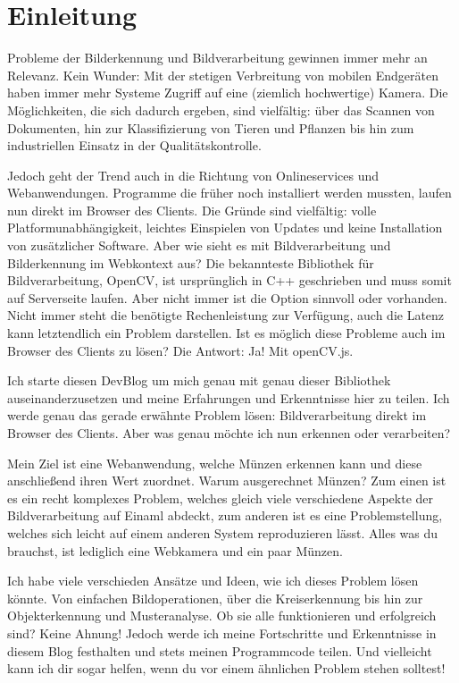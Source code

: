 \section{Einleitung}

Probleme der Bilderkennung und Bildverarbeitung gewinnen immer mehr an Relevanz. Kein Wunder: Mit der stetigen Verbreitung von mobilen Endgeräten haben immer mehr Systeme Zugriff auf eine (ziemlich hochwertige) Kamera. Die Möglichkeiten, die sich dadurch ergeben, sind vielfältig: über das Scannen von Dokumenten, hin zur Klassifizierung von Tieren und Pflanzen bis hin zum industriellen Einsatz in der Qualitätskontrolle.

Jedoch geht der Trend auch in die Richtung von Onlineservices und Webanwendungen. Programme die früher noch installiert werden mussten, laufen nun direkt im Browser des Clients. Die Gründe sind vielfältig: volle Platformunabhängigkeit, leichtes Einspielen von Updates und keine Installation von zusätzlicher Software. Aber wie sieht es mit Bildverarbeitung und Bilderkennung im Webkontext aus? Die bekannteste Bibliothek für Bildverarbeitung, OpenCV, ist ursprünglich in C++ geschrieben und muss somit auf Serverseite laufen. Aber nicht immer ist die Option sinnvoll oder vorhanden. Nicht immer steht die benötigte Rechenleistung zur Verfügung, auch die Latenz kann letztendlich ein Problem darstellen. Ist es möglich diese Probleme auch im Browser des Clients zu lösen? Die Antwort: Ja! Mit openCV.js.

Ich starte diesen DevBlog um mich genau mit genau dieser Bibliothek auseinanderzusetzen und meine Erfahrungen und Erkenntnisse hier zu teilen. Ich werde genau das gerade erwähnte Problem lösen: Bildverarbeitung direkt im Browser des Clients. Aber was genau möchte ich nun erkennen oder verarbeiten? 

Mein Ziel ist eine Webanwendung, welche Münzen erkennen kann und diese anschließend ihren Wert zuordnet. Warum ausgerechnet Münzen? Zum einen ist es ein recht komplexes Problem, welches gleich viele verschiedene Aspekte der Bildverarbeitung auf Einaml abdeckt, zum anderen ist es eine Problemstellung, welches sich leicht auf einem anderen System reproduzieren lässt. Alles was du brauchst, ist lediglich eine Webkamera und ein paar Münzen. 

Ich habe viele verschieden Ansätze und Ideen, wie ich dieses Problem lösen könnte. Von einfachen Bildoperationen, über die Kreiserkennung bis hin zur Objekterkennung und Musteranalyse. Ob sie alle funktionieren und erfolgreich sind? Keine Ahnung! Jedoch werde ich meine Fortschritte und Erkenntnisse in diesem Blog festhalten und stets meinen Programmcode teilen. Und vielleicht kann ich dir sogar helfen, wenn du vor einem ähnlichen Problem stehen solltest!

